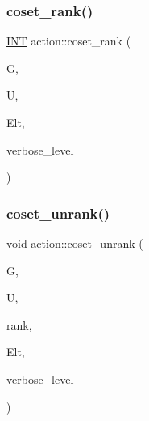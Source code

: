 \subsubsection{\texorpdfstring{coset\+\_\+rank()}{coset\_rank()}}
{\footnotesize\ttfamily \mbox{\hyperlink{galois_8h_a09fddde158a3a20bd2dcadb609de11dc}{I\+NT}} action\+::coset\+\_\+rank (\begin{DoxyParamCaption}\item[{\mbox{\hyperlink{classsims}{sims}} $\ast$}]{G,  }\item[{\mbox{\hyperlink{classsims}{sims}} $\ast$}]{U,  }\item[{\mbox{\hyperlink{galois_8h_a09fddde158a3a20bd2dcadb609de11dc}{I\+NT}} $\ast$}]{Elt,  }\item[{\mbox{\hyperlink{galois_8h_a09fddde158a3a20bd2dcadb609de11dc}{I\+NT}}}]{verbose\+\_\+level }\end{DoxyParamCaption})}

\mbox{\label{classaction_aeabf488f671d4e77a8a892eb58d82b34}} 
\subsubsection{\texorpdfstring{coset\+\_\+unrank()}{coset\_unrank()}}
{\footnotesize\ttfamily void action\+::coset\+\_\+unrank (\begin{DoxyParamCaption}\item[{\mbox{\hyperlink{classsims}{sims}} $\ast$}]{G,  }\item[{\mbox{\hyperlink{classsims}{sims}} $\ast$}]{U,  }\item[{\mbox{\hyperlink{galois_8h_a09fddde158a3a20bd2dcadb609de11dc}{I\+NT}}}]{rank,  }\item[{\mbox{\hyperlink{galois_8h_a09fddde158a3a20bd2dcadb609de11dc}{I\+NT}} $\ast$}]{Elt,  }\item[{\mbox{\hyperlink{galois_8h_a09fddde158a3a20bd2dcadb609de11dc}{I\+NT}}}]{verbose\+\_\+level }\end{DoxyParamCaption})}

\mbox{\label{classaction_a5a91ade5716041ab3d4255459a4ec256}} 
